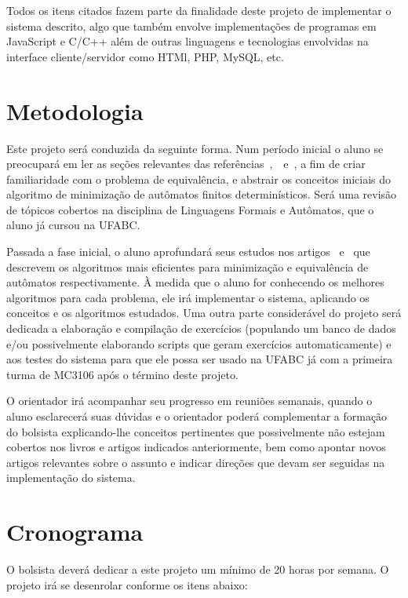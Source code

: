 \documentclass[
	12pt,				%
	openany,
	oneside,
	a4paper,			%
	english,			%
	brazil,				%
	]{abntex2}
\begin{document}
Todos os itens citados fazem parte da finalidade deste projeto de implementar o sistema descrito, algo que também envolve implementações de programas em JavaScript e C/C++ além de outras linguagens e tecnologias envolvidas na interface cliente/servidor como HTMl, PHP, MySQL, etc.

\chapter{Metodologia}

Este projeto será conduzida da seguinte forma. Num período inicial o aluno se preocupará em ler as seções relevantes das referências~\cite{sipser},~\cite{ullman}~e~\cite{linz}, a fim de criar familiaridade com o problema de equivalência, e abstrair os conceitos iniciais do algoritmo de minimização de autômatos finitos determinísticos. Será uma revisão de tópicos cobertos na disciplina de Linguagens Formais e Autômatos, que o aluno já cursou na UFABC.   

Passada a fase inicial, o aluno aprofundará seus estudos nos artigos~\cite{hopcroft} e~\cite{hopcroft_karp} que descrevem os algoritmos mais eficientes para minimização e equivalência de autômatos respectivamente.  À medida que o aluno for conhecendo os melhores algoritmos para cada problema, ele irá implementar o sistema, aplicando os conceitos e os algoritmos estudados. Uma outra parte considerável do projeto será dedicada a elaboração e compilação de exercícios (populando um banco de dados e/ou possivelmente elaborando scripts que geram exercícios automaticamente) e aos testes do sistema para que ele possa ser usado na UFABC já com a primeira turma de MC3106 após o término deste projeto.  

O orientador irá acompanhar seu progresso em reuniões semanais, quando o aluno esclarecerá suas dúvidas e o orientador poderá complementar a formação do bolsista explicando-lhe conceitos pertinentes que possivelmente não estejam cobertos nos livros e artigos indicados anteriormente, bem como apontar novos artigos relevantes sobre o assunto e indicar direções que devam ser seguidas na implementação do sistema.  



\chapter{Cronograma}

O bolsista deverá dedicar a este projeto um mínimo de 20 horas por semana. O projeto irá se desenrolar conforme os itens abaixo:  
\end{document}
